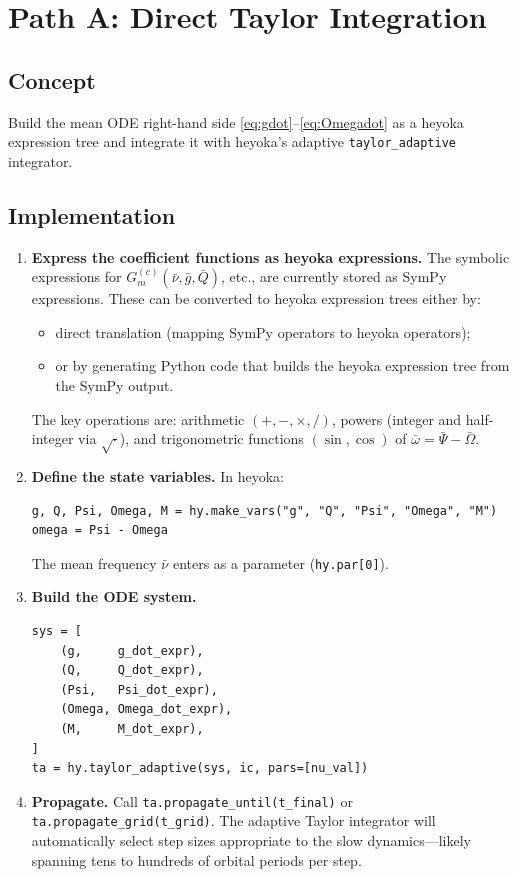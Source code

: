 \documentclass[11pt]{article}
\begin{document}
\section{Path A: Direct Taylor Integration}

\subsection{Concept}

Build the mean ODE right-hand side \eqref{eq:gdot}--\eqref{eq:Omegadot} as
a heyoka expression tree and integrate it with heyoka's adaptive
\texttt{taylor\_adaptive} integrator.

\subsection{Implementation}

\begin{enumerate}
\item \textbf{Express the coefficient functions as heyoka expressions.}
The symbolic expressions for $G^{(c)}_m(\bar\nu, \bar g, \bar Q)$, etc.,
are currently stored as SymPy expressions. These can be converted to heyoka
expression trees either by:
\begin{itemize}
\item direct translation (mapping SymPy operators to heyoka operators);
\item or by generating Python code that builds the heyoka expression tree
from the SymPy output.
\end{itemize}
The key operations are: arithmetic $(+, -, \times, /)$, powers
(integer and half-integer via $\sqrt{\cdot}$), and trigonometric functions
$(\sin, \cos)$ of $\bar\omega = \bar\Psi - \bar\Omega$.

\item \textbf{Define the state variables.} In heyoka:
\begin{verbatim}
g, Q, Psi, Omega, M = hy.make_vars("g", "Q", "Psi", "Omega", "M")
omega = Psi - Omega
\end{verbatim}
The mean frequency $\bar\nu$ enters as a parameter
(\texttt{hy.par[0]}).

\item \textbf{Build the ODE system.}
\begin{verbatim}
sys = [
    (g,     g_dot_expr),
    (Q,     Q_dot_expr),
    (Psi,   Psi_dot_expr),
    (Omega, Omega_dot_expr),
    (M,     M_dot_expr),
]
ta = hy.taylor_adaptive(sys, ic, pars=[nu_val])
\end{verbatim}

\item \textbf{Propagate.} Call \texttt{ta.propagate\_until(t\_final)} or
\texttt{ta.propagate\_grid(t\_grid)}. The adaptive Taylor integrator will
automatically select step sizes appropriate to the slow dynamics---likely
spanning tens to hundreds of orbital periods per step.
\end{enumerate}
\end{document}
